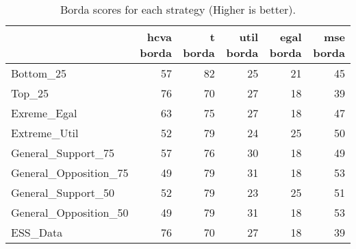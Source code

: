 \begin{table}
\caption{Borda scores for each strategy (Higher is better).}
\begin{tabular}{lrrrrr}
\toprule
 & hcva borda & t borda & util borda & egal borda & mse borda \\
\midrule
Bottom_25 & 57 & 82 & 25 & 21 & 45 \\
Top_25 & 76 & 70 & 27 & 18 & 39 \\
Exreme_Egal & 63 & 75 & 27 & 18 & 47 \\
Extreme_Util & 52 & 79 & 24 & 25 & 50 \\
General_Support_75 & 57 & 76 & 30 & 18 & 49 \\
General_Opposition_75 & 49 & 79 & 31 & 18 & 53 \\
General_Support_50 & 52 & 79 & 23 & 25 & 51 \\
General_Opposition_50 & 49 & 79 & 31 & 18 & 53 \\
ESS_Data & 76 & 70 & 27 & 18 & 39 \\
\bottomrule
\end{tabular}
\end{table}
